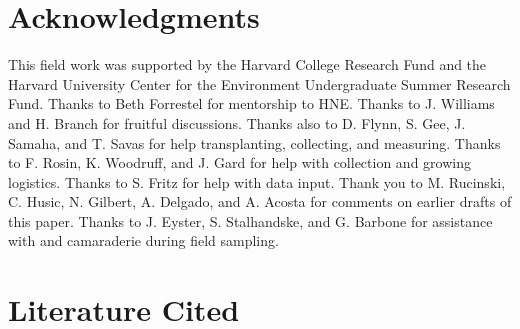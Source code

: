 \documentclass[12pt]{article}\usepackage[]{graphicx}\usepackage[]{color}
\begin{document}
	
	\section{Acknowledgments}
	 This field work was supported by the Harvard College Research Fund and the Harvard University Center for the Environment Undergraduate Summer Research Fund. Thanks to Beth Forrestel for mentorship to HNE. Thanks to J. Williams and H. Branch for fruitful discussions. Thanks also to D. Flynn, S. Gee, J. Samaha, and T. Savas for help transplanting, collecting, and measuring. Thanks to F. Rosin, K. Woodruff, and J. Gard for help with collection and growing logistics. Thanks to S. Fritz for help with data input. Thank you to M. Rucinski, C. Husic, N. Gilbert, A. Delgado, and A. Acosta for comments on earlier drafts of this paper. Thanks to J. Eyster, S. Stalhandske, and G. Barbone for assistance with and camaraderie during field sampling. 

	

\section{Literature Cited}
\printbibliography
\end{document}
